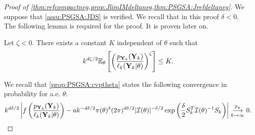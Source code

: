 \begin{proof}[Proof of \cref{thm:refcompactneg,prop:JlimIMdeltaneg,thm:PSGSA:Jrefdeltaneg}]
    We suppose that \cref{assu:PSGSA:JDS} is verified. We recall that in this proof $\delta<0$. The following lemma is required for the proof. It is proven later on.
    \begin{lem}
        \label{lem:dfbeta}
            Let $\zeta<0$. 
            There exists a constant $K$ independent of $\theta$ such that
                \begin{equation}
                    k^{d\zeta/2}\EE_\theta \left[\left(\frac{p_{\mbf Y_k}(\mbf Y_k)}{\ell_k(\mbf Y_k|\theta)}\right)^\zeta \right]\leq  K.
                \end{equation}
        \end{lem}

        We recall that \cref{prop:PSGSA:cvptheta} states the following convergence in probability for a.e. $\theta$:
\begin{equation}
    k^{d\delta/2}\left|f\left(\frac{p_{\mbf Y_k}(\mbf Y_k)}{\ell_k(\mbf Y_k|\theta)}\right)  - a k^{-d\delta/2}\pi(\theta)^\delta(2\pi)^{d\delta/2}|\cI(\theta)|^{-\delta/2}\exp\left(\frac{\delta}{2} S_k^T\cI(\theta)^{-1}S_k \right)  \right|
        \conv[\PP_\theta]{k\rightarrow\infty}0.
\end{equation}


\end{proof}
